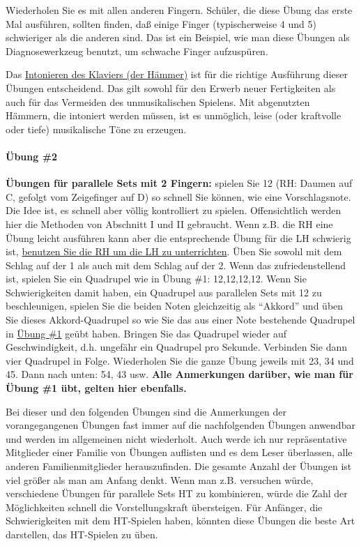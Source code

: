Wiederholen Sie es mit allen anderen Fingern.
Schüler, die diese Übung das erste Mal ausführen, sollten finden, daß einige Finger (typischerweise 4 und 5) schwieriger als die anderen sind.
Das ist ein Beispiel, wie man diese Übungen als Diagnosewerkzeug benutzt, um schwache Finger aufzuspüren.

Das \hyperref[c2_7_hamm]{Intonieren des Klaviers (der Hämmer)} ist für die richtige Ausführung dieser Übungen entscheidend.
Das gilt sowohl für den Erwerb neuer Fertigkeiten als auch für das Vermeiden des unmusikalischen Spielens.
Mit abgenutzten Hämmern, die intoniert werden müssen, ist es unmöglich, leise (oder kraftvolle oder tiefe) musikalische Töne zu erzeugen.


\paragraph{Übung \#2}
\label{c1iii7b2}

\textbf{Übungen für parallele Sets mit 2 Fingern:} spielen Sie 12 (RH: Daumen auf C, gefolgt vom Zeigefinger auf D) so schnell Sie können, wie eine Vorschlagsnote.
Die Idee ist, es schnell aber völlig kontrolliert zu spielen.
Offensichtlich werden hier die Methoden von Abschnitt I und II gebraucht.
Wenn z.B. die RH eine Übung leicht ausführen kann aber die entsprechende Übung für die LH schwierig ist, \hyperref[c1ii20]{benutzen Sie die RH um die LH zu unterrichten}.
Üben Sie sowohl mit dem Schlag auf der 1 als auch mit dem Schlag auf der 2.
Wenn das zufriedenstellend ist, spielen Sie ein Quadrupel wie in Übung \#1: 12,12,12,12.
Wenn Sie Schwierigkeiten damit haben, ein Quadrupel aus parallelen Sets mit 12 zu beschleunigen, spielen Sie die beiden Noten gleichzeitig als \enquote{Akkord} und üben Sie dieses Akkord-Quadrupel so wie Sie das aus einer Note bestehende Quadrupel in \hyperref[c1iii7b1]{Übung \#1} geübt haben.
Bringen Sie das Quadrupel wieder auf Geschwindigkeit, d.h. ungefähr ein Quadrupel pro Sekunde.
Verbinden Sie dann vier Quadrupel in Folge.
Wiederholen Sie die ganze Übung jeweils mit 23, 34 und 45.
Dann nach unten: 54, 43 usw.
\textbf{Alle Anmerkungen darüber, wie man für Übung \#1 übt, gelten hier ebenfalls.}

Bei dieser und den folgenden Übungen sind die Anmerkungen der vorangegangenen Übungen fast immer auf die nachfolgenden Übungen anwendbar und werden im allgemeinen nicht wiederholt.
Auch werde ich nur repräsentative Mitglieder einer Familie von Übungen auflisten und es dem Leser überlassen, alle anderen Familienmitglieder herauszufinden.
Die gesamte Anzahl der Übungen ist viel größer als man am Anfang denkt.
Wenn man z.B. versuchen würde, verschiedene Übungen für parallele Sets HT zu kombinieren, würde die Zahl der Möglichkeiten schnell die Vorstellungskraft übersteigen.
Für Anfänger, die Schwierigkeiten mit dem HT-Spielen haben, könnten diese Übungen die beste Art darstellen, das HT-Spielen zu üben.

